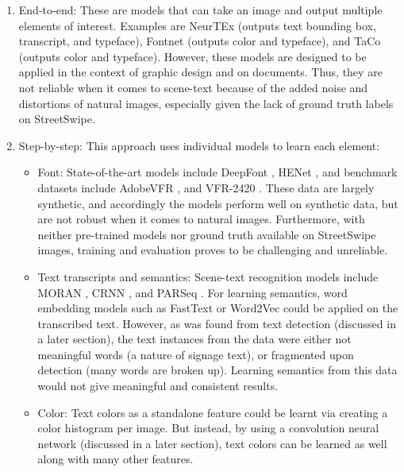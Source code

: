 \begin{enumerate}
    \item End-to-end: These are models that can take an image and output multiple elements of interest. Examples are NeurTEx \cite{aggarwal_neurtex_2022} (outputs text bounding box, transcript, and typeface), Fontnet \cite{s_fontnet_2021} (outputs color and typeface), and TaCo \cite{nie_taco_2022} (outputs color and typeface). However, these models are designed to be applied in the context of graphic design and on documents. Thus, they are not reliable when it comes to scene-text because of the added noise and distortions of natural images, especially given the lack of ground truth labels on StreetSwipe.
    \item Step-by-step: This approach uses individual models to learn each element:
    \begin{itemize}
        \item Font: State-of-the-art models include DeepFont \cite{wang_deepfont_2015}, HENet \cite{chen_henet_2021}, and benchmark datasets include AdobeVFR \cite{wang_deepfont_2015}, and VFR-2420 \cite{chen_large-scale_2014}. These data are largely synthetic, and accordingly the models perform well on synthetic data, but are not robust when it comes to natural images. Furthermore, with neither pre-trained models nor ground truth available on StreetSwipe images, training and evaluation proves to be challenging and unreliable.
        \item Text transcripts and semantics: Scene-text recognition models include MORAN \cite{luo_multi-object_2019}, CRNN \cite{shi_end2end_2015}, and PARSeq \cite{bautista_scene_2022}. For learning semantics, word embedding models such as FastText \cite{bojanowski_enriching_2017} or Word2Vec \cite{mikolov_efficient_2013} could be applied on the transcribed text. However, as was found from text detection (discussed in a later section), the text instances from the data were either not meaningful words (a nature of signage text), or fragmented upon detection (many words are broken up). Learning semantics from this data would not give meaningful and consistent results.
        \item Color: Text colors as a standalone feature could be learnt via creating a color histogram \cite{srivastava_review_2015} per image. But instead, by using a convolution neural network (discussed in a later section), text colors can be learned as well along with many other features.
    \end{itemize}
\end{enumerate}

